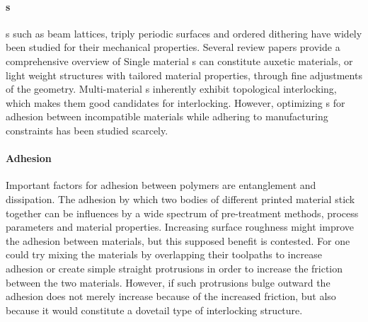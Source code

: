 \paragraph{s}
s such as beam lattices, triply periodic surfaces and ordered dithering have widely been studied for their mechanical properties.
Several review papers provide a comprehensive overview of \cite{Cadman2013,Zhang2018a,tamburrino2018}
Single material s can constitute auxetic materials, %
or light weight structures with tailored material properties, through fine adjustments of the  geometry. %
Multi-material s inherently exhibit topological interlocking, which makes them good candidates for interlocking\cite{freund2019determination}.
However, optimizing s for adhesion between incompatible materials while adhering to  manufacturing constraints has been studied scarcely.




\paragraph{Adhesion}

Important factors for adhesion between polymers are entanglement and dissipation\cite{abbott2015adhesion}.
The adhesion by which two bodies of different  printed material stick together can be influences by a wide spectrum of pre-treatment methods, process parameters and material properties\cite{freund2019determination,lopes2018multi}.
Increasing surface roughness might improve the adhesion between materials\cite{huttenbach1991interface,gent1990model}, but this supposed benefit is contested\cite{abbott2015adhesion}.
For  one could try mixing the materials by overlapping their toolpaths to increase adhesion or create simple straight protrusions in order to increase the friction between the two materials\cite{tamburrino19}.
However, if such protrusions bulge outward the adhesion does not merely increase because of the increased friction, but also because it would constitute a dovetail type of interlocking structure.

